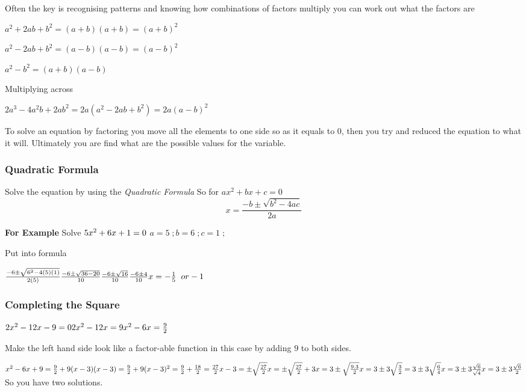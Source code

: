 \documentclass{article}
\begin{document}
Often the key is recognising patterns and knowing how combinations of factors multiply you can work out what the factors are 

$a^{2} + 2ab + b^{2} = (a + b) (a + b)  = (a + b)^{2}$

$a^{2} - 2ab + b^{2} = (a - b) (a - b)  = (a - b)^{2}$

$a^{2} - b^{2} = (a + b) (a - b)$


Multiplying across

$2a^{3} -4a^{2}b + 2ab^{2} = 2a ( a^{2} - 2ab + b^{2} ) = 2a (a-b)^{2}$

To solve an equation by factoring you move all the elements to one side so as it equals to 0,
then you try and reduced the equation to what it will.
Ultimately you are find what are the possible values for the variable.


\subsubsection{Quadratic Formula}
Solve the equation by using the \textit{Quadratic Formula}  
So for $ax^{2} + bx + c = 0$
\begin{equation}
x = \frac{-b \pm \sqrt{b^{2}-4ac}}{2a}
\end{equation}

\textbf{For Example} 
Solve $5x^{2} + 6x + 1 = 0\\$
$a = 5\;; b = 6\;; c = 1\;;$

Put into formula

$\frac{-6 \pm \sqrt{6^{2} - 4 (5) (1)}}{2 (5)}\\
\frac{-6 \pm \sqrt{36-20}}{10}\\
\frac{-6 \pm \sqrt{16}}{10} \\
\frac{-6 \pm 4}{10} \\
x = -\frac{1}{5}\;\; or -1$


\subsubsection{Completing the Square}
$2 x^{2} - 12 x - 9 = 0\\
2 x^{2} - 12 x = 9 \\
x^{2} -6 x = \frac{9}{2}$

Make the left hand side look like a factor-able function in this case by adding $9$ to both sides.

$x^{2} -6 x  + 9 = \frac{9}{2} + 9\\
(x-3) (x -3) = \frac{9}{2} + 9\\ 
(x-3)^{2} = \frac{9}{2} + \frac{18}{2} = \frac{27}{2}\\
x-3 = \pm \sqrt{\frac{27}{2}} \\
x = \pm \sqrt{\frac{27}{2}} + 3 \\
x = 3 \pm \sqrt{\frac{9 . 3}{2}} \\
x = 3 \pm 3\sqrt{\frac{3}{2}} = 3 \pm 3\sqrt{\frac{6}{4}} \\ 
x = 3 \pm 3\frac{\sqrt{6}}{\sqrt{4}} \\ 
x = 3 \pm 3\frac{\sqrt{6}}{2} $ So you have two solutions.
\end{document}
